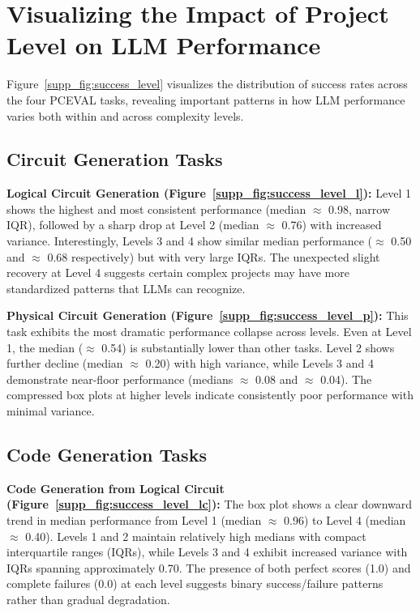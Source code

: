 \documentclass{article} %
\begin{document}
\section{Visualizing the Impact of Project Level on LLM Performance}

Figure~\ref{supp_fig:success_level} visualizes the distribution of success rates across the four PCEVAL tasks, revealing important patterns in how LLM performance varies both within and across complexity levels.

\subsection{Circuit Generation Tasks}

\textbf{Logical Circuit Generation (Figure~\ref{supp_fig:success_level_l}):}
Level 1 shows the highest and most consistent performance (median $\approx$ 0.98, narrow IQR), followed by a sharp drop at Level 2 (median $\approx$ 0.76) with increased variance. Interestingly, Levels 3 and 4 show similar median performance ($\approx$ 0.50 and $\approx$ 0.68 respectively) but with very large IQRs. The unexpected slight recovery at Level 4 suggests certain complex projects may have more standardized patterns that LLMs can recognize.

\textbf{Physical Circuit Generation (Figure~\ref{supp_fig:success_level_p}):}
This task exhibits the most dramatic performance collapse across levels. Even at Level 1, the median ($\approx$ 0.54) is substantially lower than other tasks. Level 2 shows further decline (median $\approx$ 0.20) with high variance, while Levels 3 and 4 demonstrate near-floor performance (medians $\approx$ 0.08 and $\approx$ 0.04). The compressed box plots at higher levels indicate consistently poor performance with minimal variance.


\subsection{Code Generation Tasks}

\textbf{Code Generation from Logical Circuit (Figure~\ref{supp_fig:success_level_lc}):}
The box plot shows a clear downward trend in median performance from Level 1 (median $\approx$ 0.96) to Level 4 (median $\approx$ 0.40). Levels 1 and 2 maintain relatively high medians with compact interquartile ranges (IQRs), while Levels 3 and 4 exhibit increased variance with IQRs spanning approximately 0.70. The presence of both perfect scores (1.0) and complete failures (0.0) at each level suggests binary success/failure patterns rather than gradual degradation.
\end{document}
